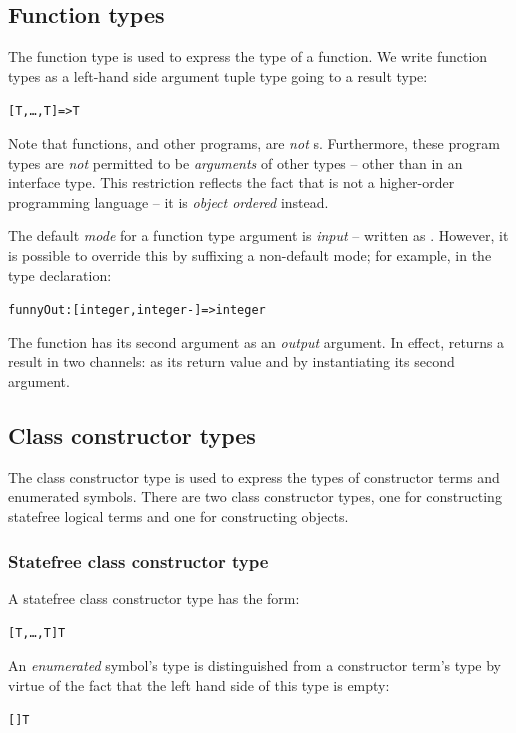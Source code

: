 \subsection{Function types}
\label{types:function}
The function type is used to express the type of a function. We write function types as a left-hand side argument tuple type going to a result type:
\begin{alltt}
[T,\ldots,T\subn]=>T
\end{alltt}
Note that functions, and other programs, are \emph{not} s. Furthermore, these program types are \emph{not} permitted to be \emph{arguments} of other types -- other than in an interface type. This restriction reflects the fact that \go is not a higher-order programming language -- it is \emph{object ordered} instead.

The default \emph{mode} for a function type argument is \emph{input} -- written as \q{+}. However, it is possible to override this by suffixing a non-default mode; for example, in the type declaration:
\begin{alltt}
funnyOut:[integer,integer-]=>integer
\end{alltt}
The  function has its second argument as an \emph{output} argument. In effect,  returns a result in two channels: as its return value and by instantiating its second argument.

\subsection{Class constructor types}
\label{types:class}
The class constructor type is used to express the types of constructor terms and enumerated symbols. There are two class constructor types, one for constructing statefree logical terms and one for constructing objects.

\subsubsection{Statefree class constructor type}

A statefree class constructor type has the form:
\begin{alltt}
[T,\ldots,T\subn]\conarrow{}T
\end{alltt}
An \emph{enumerated} symbol's type is distinguished from a constructor term's type by virtue of the fact that the left hand side of this type is empty:
\begin{alltt}
[]\conarrow{}T
\end{alltt}


